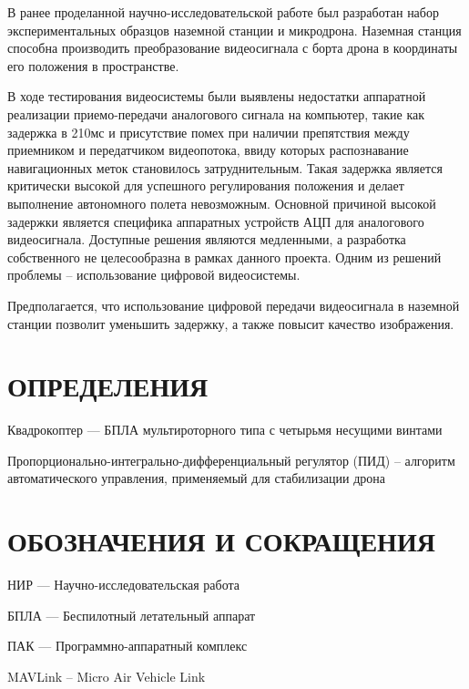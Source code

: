 \documentclass[a4paper,12pt]{article}
\begin{document}
В ранее проделанной научно-исследовательской работе был разработан набор экспериментальных образцов наземной станции и микродрона. Наземная станция способна производить преобразование видеосигнала с борта дрона в координаты его положения в пространстве.

В ходе тестирования видеосистемы были выявлены недостатки аппаратной реализации приемо-передачи аналогового сигнала на компьютер, такие как задержка в 210мс и присутствие помех при наличии препятствия между приемником и передатчиком видеопотока, ввиду которых распознавание навигационных меток становилось затруднительным. 
Такая задержка является критически высокой для успешного регулирования положения и делает выполнение автономного полета невозможным. 
Основной причиной высокой задержки является специфика аппаратных устройств АЦП для аналогового видеосигнала.
Доступные решения являются медленными, а разработка собственного не целесообразна в рамках данного проекта. Одним из решений проблемы -- использование цифровой видеосистемы.

Предполагается, что использование цифровой передачи видеосигнала в наземной станции позволит уменьшить задержку, а также повысит качество изображения.



\pagebreak
\thispagestyle{empty}

\section*{\centering ОПРЕДЕЛЕНИЯ}

\thispagestyle{empty} %

Квадрокоптер --- БПЛА мультироторного типа с четырьмя несущими винтами

Пропорционально-интегрально-дифференциальный регулятор (ПИД) – алгоритм автоматического управления, применяемый для стабилизации дрона

\pagebreak
\thispagestyle{empty}

\section*{\centering ОБОЗНАЧЕНИЯ И СОКРАЩЕНИЯ}

НИР --- Научно-исследовательская работа

БПЛА --- Беспилотный летательный аппарат

ПАК --- Программно-аппаратный комплекс

MAVLink -- Micro Air Vehicle Link
\end{document}
